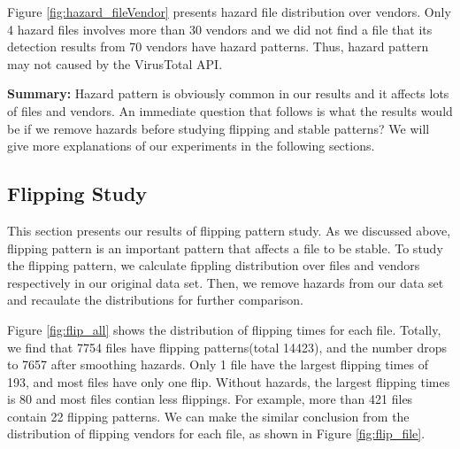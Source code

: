 Figure \ref{fig:hazard_fileVendor} presents hazard file distribution over vendors. Only 4 hazard files involves more than 30 vendors and we did not find a file that its detection results from 70 vendors have hazard patterns. Thus, hazard pattern may not caused by the VirusTotal API.








\textbf{Summary:} Hazard pattern is obviously common in our results and it affects lots of files and vendors. An immediate question that follows is what the results would be if we remove hazards before studying flipping and stable patterns? We will give more explanations of our experiments in the following sections.  

\subsection{Flipping Study}



This section presents our results of flipping pattern study. As we discussed above, flipping pattern is an important pattern that affects a file to be stable. To study the flipping pattern, we calculate fippling distribution over files and vendors respectively in our original data set. Then, we remove hazards from our data set and recaulate the distributions for further comparison. 

Figure \ref{fig:flip_all} shows the distribution of flipping times for each file. Totally, we find that 7754 files have flipping patterns(total 14423), and the number drops to 7657 after smoothing hazards. Only 1 file have the largest flipping times of 193, and most files have only one flip. Without hazards, the largest flipping times is 80 and most files contian less flippings. For example, more than 421 files contain 22 flipping patterns. We can make the similar conclusion from the distribution of flipping vendors for each file, as shown in Figure \ref{fig:flip_file}. 

